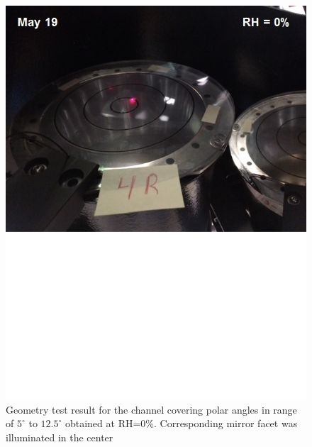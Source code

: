 \begin{figure}[ht]
    \centering
    \includegraphics[width=1.0\linewidth,trim={0 8.5cm 0 0},clip]{images/GEO_TEST_4_Zero.jpg}
    \caption{Geometry test result for the channel covering polar angles in range of $5^\circ$ to $12.5^\circ$ obtained at RH=0\%. Corresponding mirror facet was illuminated in the center}
    \label{fig:GEO_TEST_4_Zero}
\end{figure}

